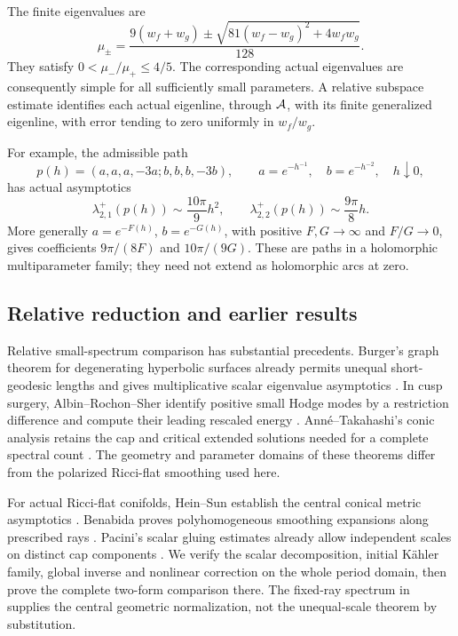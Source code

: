 The finite eigenvalues are
\begin{equation}\label{eq:finite-roots-intro}
 \mu_\pm=
 \frac{9(w_f+w_g)\pm\sqrt{81(w_f-w_g)^2+4w_fw_g}}{128}.
\end{equation}
They satisfy $0<\mu_-/\mu_+\le4/5$. The corresponding actual
eigenvalues are consequently simple for all sufficiently small
parameters. A relative subspace estimate identifies each actual
eigenline, through $\mathcal A$, with its finite generalized eigenline, with
error tending to zero uniformly in $w_f/w_g$.

For example, the admissible path
\begin{equation}\label{eq:separated-path-intro}
 p(h)=(a,a,a,-3a;b,b,b,-3b),\qquad
 a=e^{-h^{-1}},\quad b=e^{-h^{-2}},\quad h\downarrow0,
\end{equation}
has actual asymptotics
\begin{equation}\label{eq:separated-spectrum-intro}
 \lambda_{2,1}^+(p(h))\sim\frac{10\pi}{9}h^2,
 \qquad
 \lambda_{2,2}^+(p(h))\sim\frac{9\pi}{8}h.
\end{equation}
More generally $a=e^{-F(h)}$, $b=e^{-G(h)}$, with positive
$F,G\to\infty$ and $F/G\to0$, gives coefficients
$9\pi/(8F)$ and $10\pi/(9G)$. These are paths in a holomorphic
multiparameter family; they need not extend as holomorphic arcs at zero.

\subsection{Relative reduction and earlier results}

Relative small-spectrum comparison has substantial precedents. Burger's
graph theorem for degenerating hyperbolic surfaces already permits
unequal short-geodesic lengths and gives multiplicative scalar
eigenvalue asymptotics \cite[Theorem~1.1]{burger}. In cusp surgery,
Albin--Rochon--Sher identify positive small Hodge modes by a restriction
difference and compute their leading rescaled energy
\cite[Section~3, Lemma~3.2 and Theorem~3.3]{ars-cusps}.
Anné--Takahashi's conic analysis retains the cap and critical extended
solutions needed for a complete spectral count
\cite[Theorems~A--B]{anne-takahashi}. The geometry and parameter domains
of these theorems differ from the polarized Ricci-flat smoothing used
here.

For actual Ricci-flat conifolds, Hein--Sun establish the central conical
metric asymptotics \cite[Theorem~1.4]{hein-sun}. Benabida proves
polyhomogeneous smoothing expansions along prescribed rays
\cite[Theorem~C]{benabida}. Pacini's scalar gluing estimates already
allow independent scales on distinct cap components
\cite[Theorems~11.7 and 12.3]{pacini}. We verify the scalar decomposition,
initial K\"ahler family, global inverse and nonlinear correction on the
whole period domain, then prove the complete two-form comparison there.
The fixed-ray spectrum in \cite{wuebben-hodge} supplies the central
geometric normalization, not the unequal-scale theorem by substitution.

